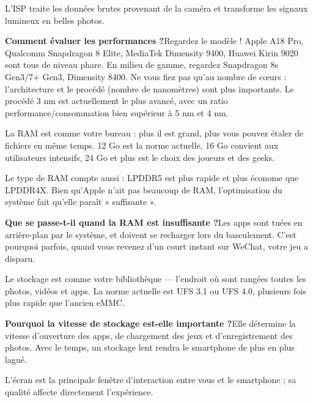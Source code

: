 
L'ISP traite les données brutes provenant de la caméra et transforme les signaux lumineux en belles photos.

\textbf{Comment évaluer les performances ?}Regardez le modèle ! Apple A18 Pro, Qualcomm Snapdragon 8 Elite, MediaTek Dimensity 9400, Huawei Kirin 9020 sont tous de niveau phare. En milieu de gamme, regardez Snapdragon 8s Gen3/7+ Gen3, Dimensity 8400. Ne vous fiez pas qu'au nombre de cœurs : l'architecture et le procédé (nombre de nanomètres) sont plus importants. Le procédé 3 nm est actuellement le plus avancé, avec un ratio performance/consommation bien supérieur à 5 nm et 4 nm.


La RAM est comme votre bureau : plus il est grand, plus vous pouvez étaler de fichiers en même temps. 12 Go est la norme actuelle, 16 Go convient aux utilisateurs intensifs, 24 Go et plus est le choix des joueurs et des geeks.

Le type de RAM compte aussi : LPDDR5 est plus rapide et plus économe que LPDDR4X. Bien qu'Apple n'ait pas beaucoup de RAM, l'optimisation du système fait qu'elle paraît « suffisante ».

\textbf{Que se passe-t-il quand la RAM est insuffisante ?}Les apps sont tuées en arrière-plan par le système, et doivent se recharger lors du basculement. C'est pourquoi parfois, quand vous revenez d'un court instant sur WeChat, votre jeu a disparu.


Le stockage est comme votre bibliothèque — l'endroit où sont rangées toutes les photos, vidéos et apps. La norme actuelle est UFS 3.1 ou UFS 4.0, plusieurs fois plus rapide que l'ancien eMMC.

\textbf{Pourquoi la vitesse de stockage est-elle importante ?}Elle détermine la vitesse d'ouverture des apps, de chargement des jeux et d'enregistrement des photos. Avec le temps, un stockage lent rendra le smartphone de plus en plus lagué.


L'écran est la principale fenêtre d'interaction entre vous et le smartphone ; sa qualité affecte directement l'expérience.

